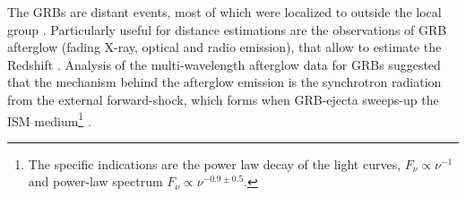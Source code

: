 The \acp{GRB} are distant events, most of which were localized to outside the local 
group \citep[\eg][]{Mao:1992,Piran:1992,Fenimore:1993}. 
%
Particularly useful for distance estimations are the observations of \ac{GRB} afterglow
(fading X-ray, optical and radio emission), 
that allow to estimate the Redshift \citep[\eg][]{Costa:1997cg,Frontera:1997ae}.
%
Analysis of the multi-wavelength afterglow data for \acp{GRB} \citep[\eg][]{Panaitescu:2001bx} suggested that the mechanism behind the afterglow 
emission is the synchrotron radiation from the external forward-shock, which forms 
when \ac{GRB}-ejecta sweeps-up the \ac{ISM} medium\footnote{
    The specific indications are the power law decay of the light curves, 
    $F_{\nu}\propto \nu^{-1}$ and power-law spectrum $F_{\nu}\propto\nu^{-0.9\pm 0.5}$.
} 
\citep{Rees:1992ek,Paczynski:1993gz,Meszaros:1993ju,Meszaros:1996sv}.
%

